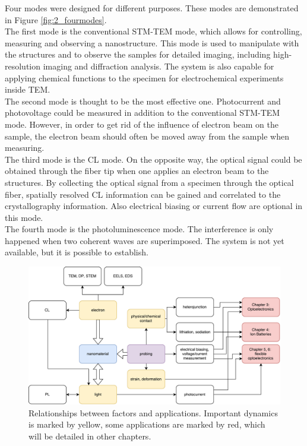 Four modes were designed for different purposes. These modes are demonstrated in Figure \ref{fig:2_fourmodes}.\\

The first mode is the conventional STM-TEM mode, which allows for controlling, measuring and observing a nanostructure. This mode is used to manipulate with the structures and to observe the samples for detailed imaging, including high-resolution imaging and diffraction analysis. 
The system is also capable for applying chemical functions to the specimen for electrochemical experiments inside TEM. \\

The second mode is thought to be the most effective one. Photocurrent and photovoltage could be measured in addition to the conventional STM-TEM mode.
However, in order to get rid of the influence of electron beam on the sample, the electron beam should often be moved away from the sample when measuring.\\

The third mode is the CL mode. On the opposite way, the optical signal could be obtained through the fiber tip when one applies an electron beam to the structures. By collecting the optical signal from a specimen through the optical fiber, spatially resolved CL information can be gained and correlated to the crystallography information. Also electrical biasing or current flow are optional in this mode. \\

The fourth mode is the photoluminescence mode. The interference is only happened when two coherent waves are superimposed. The system is not yet available, but it is possible to establish. 


\begin{figure}  
\includegraphics[width=\textwidth]{figures/figure2_apply}
\caption[Relationships between factors and applications.]{Relationships between factors and applications. Important dynamics is marked by yellow, some applications are marked by red, which will be detailed in other chapters.
\label{fig:2_apply}}
\end{figure}

